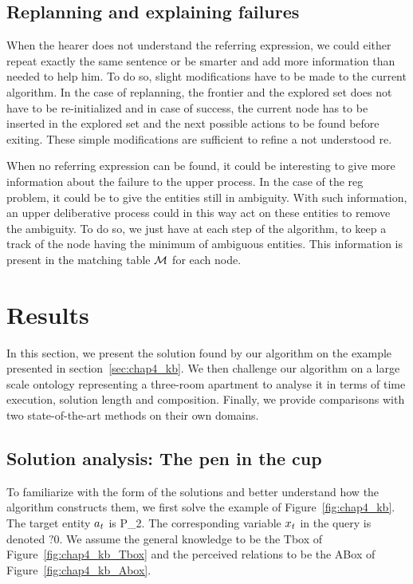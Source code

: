 \subsection{Replanning and explaining failures}

When the hearer does not understand the referring expression, we could either repeat exactly the same sentence or be smarter and add more information than needed to help him. To do so, slight modifications have to be made to the current algorithm. In the case of replanning, the frontier and the explored set does not have to be re-initialized and in case of success, the current node has to be inserted in the explored set and the next possible actions to be found before exiting. These simple modifications are sufficient to refine a not understood \acrshort{re}.

When no referring expression can be found, it could be interesting to give more information about the failure to the upper process. In the case of the \acrshort{reg} problem, it could be to give the entities still in ambiguity. With such information, an upper deliberative process could in this way act on these entities to remove the ambiguity. To do so, we just have at each step of the algorithm, to keep a track of the node having the minimum of ambiguous entities. This information is present in the matching table $\mathcal{M}$ for each node.

\section{Results}

In this section, we present the solution found by our algorithm on the example presented in section~\ref{sec:chap4_kb}. We then challenge our algorithm on a large scale ontology representing a three-room apartment to analyse it in terms of time execution, solution length and composition. Finally, we provide comparisons with two state-of-the-art methods on their own domains.

\subsection{Solution analysis: The pen in the cup}

To familiarize with the form of the solutions and better understand how the algorithm constructs them, we first solve the example of Figure~\ref{fig:chap4_kb}. The target entity $a_t$ is P\_2. The corresponding variable $x_t$ in the \sparql{} query is denoted $?0$. We assume the general knowledge to be the Tbox of Figure~\ref{fig:chap4_kb_Tbox} and the perceived relations to be the ABox of Figure~\ref{fig:chap4_kb_Abox}.

